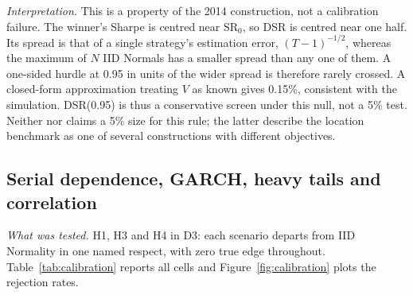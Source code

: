 \documentclass[11pt,a4paper]{article}
\newcommand{\SR}{\mathrm{SR}}
\theoremstyle{remark}
\begin{document}
\emph{Interpretation.} This is a property of the 2014 construction, not a calibration failure. The winner's Sharpe is centred near $\SR_0$, so DSR is centred near one half. Its spread is that of a single strategy's estimation error, $(T-1)^{-1/2}$, whereas the maximum of $N$ IID Normals has a smaller spread than any one of them. A one-sided hurdle at 0.95 in units of the wider spread is therefore rarely crossed. A closed-form approximation treating $V$ as known gives 0.15\%, consistent with the simulation. DSR(0.95) is thus a conservative screen under this null, not a 5\% test. Neither \citet{bailey2014dsr} nor \citet{lopezdeprado2026porcu} claims a 5\% size for this rule; the latter describe the location benchmark as one of several constructions with different objectives.

\subsection{Serial dependence, GARCH, heavy tails and correlation}\label{sec:res:calib}

\emph{What was tested.} H1, H3 and H4 in D3: each scenario departs from IID Normality in one named respect, with zero true edge throughout. Table~\ref{tab:calibration} reports all cells and Figure~\ref{fig:calibration} plots the rejection rates.
\end{document}
